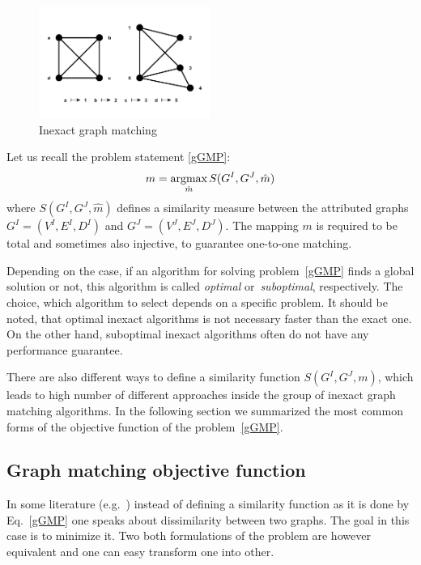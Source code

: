 \vspace{-12pt}
\begin{figure}[htb]
	\centering
	\includegraphics[width=0.5\textwidth]{chapter1/fig/inexactGM}
    \caption{Inexact graph matching}
    \label{fig:inexact_GM}
\end{figure}
\vspace{-10pt}
Let us recall the problem statement \eqref{gGMP}: 
\begin{equation*}
m = \mathop{\rm argmax}_{\hat{m}}S(G^I, G^J, \hat{m})
\end{equation*}
where $S(G^I, G^J, \hat{m})$ defines a similarity measure between the attributed graphs $G^I = (V^I, E^I,D^I)$ and $G^J = (V^J, E^J,D^J)$. The mapping $m$ is required to be total and sometimes also injective, to guarantee one-to-one matching.

Depending on the case, if an algorithm for solving problem~\eqref{gGMP} finds a global solution or not, this algorithm is called \emph{optimal} or~\emph{suboptimal}, respectively. The choice, which algorithm to select depends on a specific problem. It should be noted, that optimal inexact algorithms is not necessary faster than the exact one. On the other hand, suboptimal inexact algorithms often do not have any performance guarantee.

There are also different ways to define a similarity function $S(G^I,G^J,m)$, which leads to high number of different approaches inside the group of inexact graph matching algorithms. In the following section we summarized the most common forms of the objective function of the problem~\eqref{gGMP}.
\subsection{Graph matching objective function}
In some literature (e.g.~\cite{Herault1990_SimulatedAnnealing,FastPFP,Lyzinski2015,Roth2001,Vogelstein_BrainGraphs,Zazlavskiy2008_PATH}) instead of defining a similarity function as it is done by Eq.~\eqref{gGMP} one speaks about dissimilarity between two graphs. The goal in this case is to minimize it. Two both formulations of the problem are however equivalent and one can easy transform one into other.
